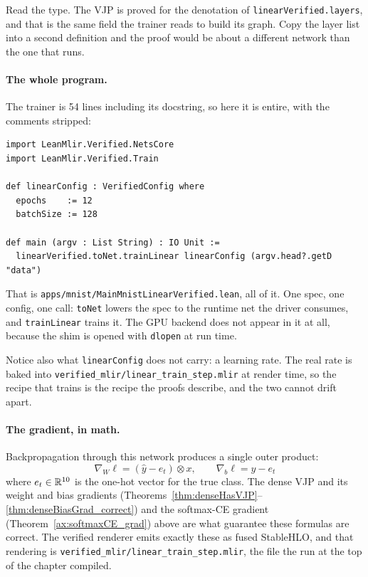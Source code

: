 Read the type. The VJP is proved for the denotation of
\texttt{linearVerified.layers}, and that is the same field the trainer
reads to build its graph. Copy the layer list into a second definition
and the proof would be about a different network than the one that runs.

\paragraph{The whole program.}
The trainer is 54 lines including its docstring, so here it is entire,
with the comments stripped:

\begin{verbatim}
import LeanMlir.Verified.NetsCore
import LeanMlir.Verified.Train

def linearConfig : VerifiedConfig where
  epochs    := 12
  batchSize := 128

def main (argv : List String) : IO Unit :=
  linearVerified.toNet.trainLinear linearConfig (argv.head?.getD "data")
\end{verbatim}

That is \texttt{apps/mnist/MainMnistLinearVerified.lean}, all of it. One
spec, one config, one call: \texttt{toNet} lowers the spec to the runtime
net the driver consumes, and \texttt{trainLinear} trains it. The GPU backend does not appear in it at all,
because the shim is opened with \texttt{dlopen} at run time.

Notice also what \texttt{linearConfig} does not carry: a learning rate.
The real rate is baked into
\texttt{verified\_mlir/linear\_train\_step.mlir} at render time, so the
recipe that trains is the recipe the proofs describe, and the two cannot
drift apart.

\paragraph{The gradient, in math.}
Backpropagation through this network produces a single outer
product:
\[
  \nabla_W \ell = (\hat{y} - e_t) \otimes x, \qquad
  \nabla_b \ell = \hat{y} - e_t
\]
where \(e_t \in \mathbb{R}^{10}\) is the one-hot vector for the true
class. The dense VJP and its weight and bias gradients
(Theorems~\ref{thm:denseHasVJP}--\ref{thm:denseBiasGrad_correct})
and the softmax-CE gradient (Theorem~\ref{ax:softmaxCE_grad}) above are
what guarantee these formulas are correct. The
verified renderer emits exactly these as fused StableHLO, and that
rendering is \texttt{verified\_mlir/linear\_train\_step.mlir}, the file
the run at the top of the chapter compiled.

